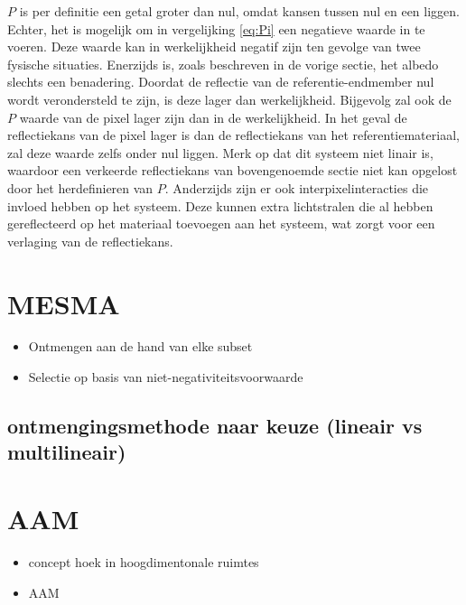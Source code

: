 \documentclass[12pt]{report}
\begin{document}
$P$ is per definitie een getal groter dan nul, omdat kansen tussen nul en een liggen. Echter, het is mogelijk om in vergelijking \ref{eq:Pi} een negatieve waarde in te voeren. Deze waarde kan in werkelijkheid negatif zijn ten gevolge van twee fysische situaties. Enerzijds is, zoals beschreven in de vorige sectie, het albedo slechts een benadering. Doordat de reflectie van de referentie-endmember nul wordt verondersteld te zijn, is deze lager dan werkelijkheid. Bijgevolg zal ook de $P$ waarde van de pixel lager zijn dan in de werkelijkheid. In het geval de reflectiekans van de pixel lager is dan de reflectiekans van het referentiemateriaal, zal deze waarde zelfs onder nul liggen. Merk op dat dit systeem niet linair is, waardoor een verkeerde reflectiekans van bovengenoemde sectie niet kan opgelost door het herdefinieren van $P$. Anderzijds zijn er ook interpixelinteracties die invloed hebben op het systeem. Deze kunnen extra lichtstralen die al hebben gereflecteerd op het materiaal toevoegen aan het systeem, wat zorgt voor een verlaging van de reflectiekans. 






\section{MESMA} \label{sec:mesma}

\begin{itemize}
\item Ontmengen aan de hand van elke subset
\item Selectie op basis van niet-negativiteitsvoorwaarde
\end{itemize}

\subsection{ontmengingsmethode naar keuze (lineair vs multilineair)}

\section{AAM}

\begin{itemize}
\item concept hoek in hoogdimentonale ruimtes
\item AAM
\end{itemize}
\end{document}
